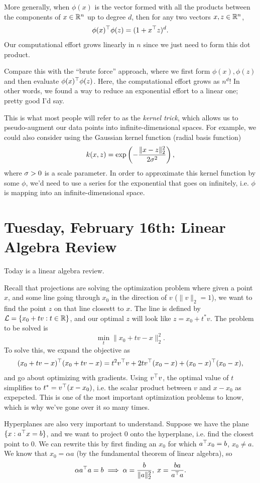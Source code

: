 \documentclass[11 pt]{scrartcl}
\begin{document}
More generally, when $\phi(x)$ is the vector formed with all the products between the components of $x\in \mathbb R^n$ up to degree $d$, then for any two vectors $x,z\in \mathbb R^n$, 
\[ \phi(x)^\top \phi(z) = (1+x^\top z)^d.\] 
Our computational effort grows linearly in $n$ since we just need to form this dot product. 

Compare this with the ``brute force'' approach, where we first form $\phi(x),\phi(z)$ and then evaluate $\phi(x)^\top \phi(z)$. 
Here, the computational effort grows as $n^d$! 
In other words, we found a way to reduce an exponential effort to a linear one; pretty good I'd say. 

This is what most people will refer to as the \emph{kernel trick}, which allows us to pseudo-augment our data points into infinite-dimensional spaces. 
For example, we could also consider using the Gaussian kernel function (radial basis function) 
\[ k(x,z) = \exp \left(-\dfrac{\|x-z\|^2_2}{2\sigma^2}\right),\] 
where $\sigma>0$ is a scale parameter. 
In order to approximate this kernel function by some $\phi$, we'd need to use a series for the exponential that goes on infinitely, i.e. $\phi$ is mapping into an infinite-dimensional space. 

\newpage
\section{Tuesday, February 16th: Linear Algebra Review}
Today is a linear algebra review.

Recall that projections are solving the optimization problem where given a point $x$, and some line going through $x_0$ in the direction of $v$ ($\|v\|_2 = 1$), we want to find the point $z$ on that line closestt to $x$. 
The line is defined by $\mathcal L = \{x_0 + tv : t\in \mathbb R\}$, and our optimal $z$ will look like $z = x_0 + t^* v$. 
The problem to be solved is 
\[ \min_t \|x_0 + tv - x\|_2^2.\] 
To solve this, we expand the objective as 
\[ (x_0+tv - x)^\top (x_0 + tv - x) =  t^2 v^\top v + 2tv^\top (x_0-x) + (x_0-x)^\top (x_0 - x) ,\]
and go about optimizing with gradients. 
Using $v^\top v$, the optimal value of $t$ simplifies to $t^* = v^\top (x-x_0)$, i.e. the scalar product between $v$ and $x-x_0$ as expepcted. 
This is one of the most important optimization problems to know, which is why we've gone over it so many times.

Hyperplanes are also very important to understand. 
Suppose we have the plane $\{x: a^\top x = b\}$, and we want to project $0$ onto the hyperplane, i.e. find the closest point to 0.
We can rewrite this by first finding an $x_0$ for which $a^\top x_0 = b$, $x_0\not= a$. 
We know that $x_0 = \alpha a$ (by the fundamental theorem of linear algebra), so 
\[ \alpha a^\top a = b \implies \alpha = \frac{b}{\|a\|_2^2},\; x = \frac{ba}{a^\top a}.\]
\end{document}
